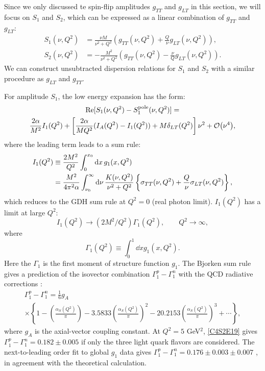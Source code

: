 Since we only discussed te spin-flip amplitudes $g_{TT}$ and $g_{LT}$ in this section, we will focus on $S_1$ and $S_2$, which can be expressed as a linear combination of $g_{TT}$ and $g_{LT}$:
\begin{equation} \label{C4S2E14}
\begin{split}
S_1(\nu,Q^2) & = \frac{\nu M}{\nu^2+Q^2}\left(g_{TT}(\nu,Q^2)+\frac{Q}{\nu}g_{LT}(\nu,Q^2)\right), \\
S_2(\nu,Q^2) & = -\frac{M^2}{\nu^2+Q^2}\left(g_{TT}(\nu,Q^2)-\frac{\nu}{Q}g_{LT}(\nu,Q^2)\right).
\end{split}
\end{equation}
We can construct unsubtracted dispersion relations for $S_1$ and $S_2$ with a similar procedure as $g_{LT}$ and $g_{TT}$.

For amplitude $S_1$, the low energy expansion has the form:
\begin{multline} \label{C4S2E15}
\Re[S_1(\nu,Q^2)-S_1^{\mathrm{pole}}(\nu,Q^2)] = \\
\frac{2\alpha}{M^2}I_1(Q^2)+\left[\frac{2\alpha}{MQ^2}(I_A(Q^2)-I_1(Q^2))+M\dlt(Q^2)\right]\nu^2+\order{\nu^4},
\end{multline}
where the leading term leads to a sum rule:
\begin{equation} \label{C4S2E16}
\begin{split}
I_1(Q^2) & \equiv \frac{2M^2}{Q^2}\int_0^{x_0}\dd{x}g_1(x,Q^2) \\
& = \frac{M^2}{4\pi^2\alpha}\int_{\nu_0}^\infty\dd{\nu}\frac{K(\nu,Q^2)}{\nu^2+Q^2}\left\{\sigma_{TT}(\nu,Q^2)+\frac{Q}{\nu}\sigma_{LT}(\nu,Q^2)\right\},
\end{split}
\end{equation}
which reduces to the GDH sum rule at $Q^2=0$ (real photon limit). $I_1(Q^2)$ has a limit at large $Q^2$:
\begin{equation} \label{C4S2E17}
I_1(Q^2)\rightarrow(2M^2/Q^2)\Gamma_1(Q^2), \qquad Q^2\rightarrow\infty,
\end{equation}
where
\begin{equation} \label{C4S2E18}
\Gamma_1(Q^2) \equiv \int_0^1\dd{x}g_1(x,Q^2).
\end{equation}
Here the $\Gamma_1$ is the first moment of structure function $g_1$. The Bjorken sum rule \cite{Bjorken1966,Bjorken1970} gives a prediction of the isovector combination $\Gamma_1^p-\Gamma_1^n$ with the QCD radiative corrections \cite{Larin1991}:
\begin{multline} \label{C4S2E19}
\Gamma_1^p-\Gamma_1^n = \frac{1}{6}g_A \\
\times\left\{1-\left(\frac{\alpha_S(Q^2)}{\pi}\right)-3.5833\left(\frac{\alpha_S(Q^2)}{\pi}\right)^2-20.2153\left(\frac{\alpha_S(Q^2)}{\pi}\right)^3+\cdots\right\},
\end{multline}
where $g_A$ is the axial-vector coupling constant. At $Q^2=5$ GeV${}^2$, \cref{C4S2E19} gives $\Gamma_1^p-\Gamma_1^n=0.182\pm0.005$ if only the three light quark flavors are considered. The next-to-leading order fit to global $g_1$ data gives $\Gamma_1^p-\Gamma_1^n=0.176\pm0.003\pm0.007$ \cite{Anthony2000}, in agreement with the theoretical calculation.

